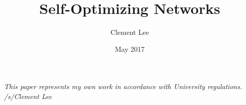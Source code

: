 \documentclass[12pt]{report}
\title{Self-Optimizing Networks}
\author{Clement Lee}
\date{May 2017}
\begin{document}
{} 





\tableofcontents
\pagebreak















\nocite{*}



\vfill
\begin{center}
\emph{This paper represents my own work in accordance with University regulations.\\
/s/Clement Lee}
\end{center}
\end{document}
